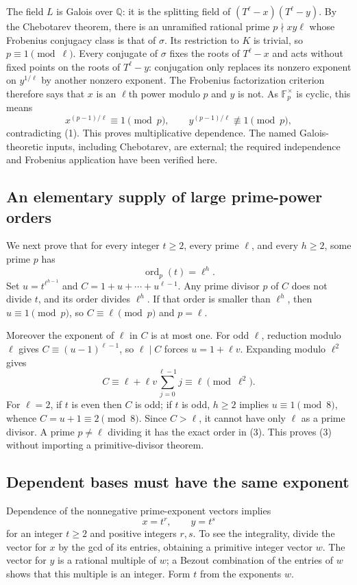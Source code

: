 The field $L$ is Galois over $\mathbb Q$: it is the splitting field of
$(T^\ell-x)(T^\ell-y)$. By the Chebotarev theorem, there is an unramified rational prime $p\nmid xy\ell$ whose Frobenius conjugacy class is that of $\sigma$. Its restriction to $K$ is trivial, so $p\equiv1\pmod\ell$. Every conjugate of $\sigma$ fixes the roots of $T^\ell-x$ and acts without fixed points on the roots of $T^\ell-y$: conjugation only replaces its nonzero exponent on $y^{1/\ell}$ by another nonzero exponent.
The Frobenius factorization criterion therefore says that $x$ is an $\ell$th power modulo $p$ and $y$ is not. As $\mathbb F_p^\times$ is cyclic, this means
\[
 x^{(p-1)/\ell}\equiv1\pmod p,\qquad
 y^{(p-1)/\ell}\not\equiv1\pmod p,
\]
contradicting (1). This proves multiplicative dependence. The named Galois-theoretic inputs, including Chebotarev, are external; the required independence and Frobenius application have been verified here.

\subsection*{An elementary supply of large prime-power orders}
We next prove that for every integer $t\ge2$, every prime $\ell$, and every $h\ge2$, some prime $p$ has
\[
 \operatorname{ord}_p(t)=\ell^h.
 \tag{3}
\]
Set $u=t^{\ell^{h-1}}$ and $C=1+u+\cdots+u^{\ell-1}$.
Any prime divisor $p$ of $C$ does not divide $t$, and its order divides $\ell^h$. If that order is smaller than $\ell^h$, then $u\equiv1\pmod p$, so $C\equiv\ell\pmod p$ and $p=\ell$.

Moreover the exponent of $\ell$ in $C$ is at most one. For odd $\ell$, reduction modulo $\ell$ gives
$C\equiv(u-1)^{\ell-1}$, so $\ell\mid C$ forces $u=1+\ell v$. Expanding modulo $\ell^2$ gives
\[
 C\equiv\ell+\ell v\sum_{j=0}^{\ell-1}j\equiv\ell\pmod{\ell^2}.
\]
For $\ell=2$, if $t$ is even then $C$ is odd; if $t$ is odd, $h\ge2$ implies $u\equiv1\pmod8$, whence $C=u+1\equiv2\pmod8$.
Since $C>\ell$, it cannot have only $\ell$ as a prime divisor. A prime $p\ne\ell$ dividing it has the exact order in (3). This proves (3) without importing a primitive-divisor theorem.

\subsection*{Dependent bases must have the same exponent}
Dependence of the nonnegative prime-exponent vectors implies
\[
 x=t^r,\qquad y=t^s
\]
for an integer $t\ge2$ and positive integers $r,s$. To see the integrality, divide the vector for $x$ by the gcd of its entries, obtaining a primitive integer vector $w$. The vector for $y$ is a rational multiple of $w$; a Bezout combination of the entries of $w$ shows that this multiple is an integer. Form $t$ from the exponents $w$.

